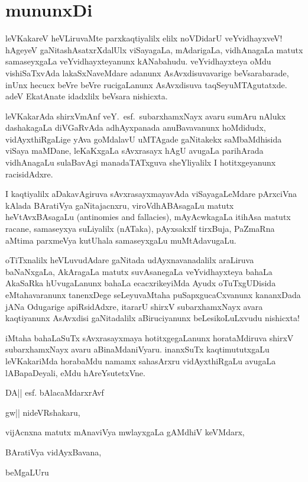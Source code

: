 \chapter*{mununxDi}

leVKakareV heVLiruvaMte parxkaqtiyalilx elilx noVDidarU veYvidhayxveV! hAgeyeV gaNita\-shAsatxrXdalUlx viSayagaLa, mAdarigaLa, vidhAnagaLa matutx samaseyxgaLa veYvidhayxteyanunx kANabahudu. veYvidhayxteya oMdu vishiSaTxvAda lakaSxNaveMdare adanunx AsAvxdisuvavarige beVsarabarade, inUnx hecucx beVre beVre rucigaLanunx AsAvxdisuva taqSeyuMTAgutatxde. adeV EkatAnate idadxlilx beVsara nishicxta.

leVKakarAda shirxVmAnf veY.~esf.~subarxhamxNayx avaru sumAru nAlukx dashaka\-gaLa diVGaRvAda adhAyxpanada anuBavavanunx hoMdidudx, vidAyxthiRgaLige yAva goMdalavU uMTAgade gaNitakekx saMbaMdhisida viSaya maMDane, leKaKxgaLa sAvxrasayx hAgU avugaLa parihArada vidhAnagaLu sulaBavAgi manadaTATxguva sheYliyalilx I hotitxgeyanunx racisidAdxre.

I kaqtiyalilx aDakavAgiruva sAvxrasayxmayavAda viSayagaLeMdare pArxciVna kAlada BAratiVya gaNitajacnxru, viroVdhABAsagaLu matutx heVtAvxBAsagaLu {\rm (antinomies and fallacies)}, mAyAcwkagaLa itihAsa matutx racane, samaseyxya suLiyalilx (nATaka), pAyxsakxlf tirxBuja, PaZmaRna aMtima parxmeVya kutUhala samaseyxgaLu muMtAdavugaLu.

oTiTxnalilx heVLuvudAdare gaNitada udAyxnavanadalilx araLiruva baNaNxgaLa, AkAragaLa matutx suvAsanegaLa veYvidhayxteya bahaLa AkaSaRka hUvugaLanunx bahaLa ecacxrikeyiMda Ayudx oTuTxgUDisida eMtahavaranunx tanenxDege seLeyuvaMtaha puSapxgucaCxvanunx kananxDada jANa Odugarige apiRsidAdxre, itararU shirxV subarxhamxNayx avara kaqtiyanunx AsAvxdisi gaNitadalilx aBiruciyanunx beLesikoLuLxvudu nishicxta! 

\newpage
iMtaha bahaLaSuTx sAvxrasayxmaya hotitxgegaLanunx horataMdiruva shirxV subarxhamxNayx avaru aBinaMdaniVyaru. inanxSuTx kaqtimututxgaLu leVKakariMda horabaMdu namamx sahasArxru vidAyxthiRgaLu avugaLa lABapaDeyali, eMdu hAreYsutetxVne.

\hfill{DA|| esf. bAlacaMdarxrAvf}

\begin{flushleft}
gw|| nideVRshakaru,

vijAcnxna matutx mAnaviVya mwlayxgaLa gAMdhiV keVMdarx,

BAratiVya vidAyxBavana,

beMgaLUru 
\end{flushleft}
